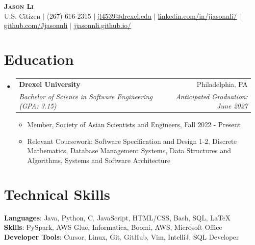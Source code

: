 \documentclass[letterpaper,11pt]{article}
\makeatletter
\newcommand{\resumeItem}[1]{
  \item\small{
    {#1 \vspace{-2pt}}
  }
}
\newcommand{\resumeSubheading}[4]{
  \vspace{-2pt}\item
    \begin{tabular*}{0.97\textwidth}[t]{l@{\extracolsep{\fill}}r}
      \textbf{#1} & #2 \\
      \textit{\small#3} & \textit{\small #4} \\
    \end{tabular*}\vspace{-7pt}
}
\newcommand{\resumeSubHeadingListStart}{\begin{itemize}[leftmargin=0.15in, label={}]}
\newcommand{\resumeSubHeadingListEnd}{\end{itemize}}
\newcommand{\resumeItemListStart}{\begin{itemize}}
\newcommand{\resumeItemListEnd}{\end{itemize}\vspace{-5pt}}
\makeatother
\begin{document}
\begin{center}
    \textbf{\Huge \scshape Jason Li} \\ \vspace{1pt}
    \small U.S. Citizen $|$ (267) 616-2315 $|$ 
    \href{mailto:jl4539@drexel.edu}{\underline{jl4539@drexel.edu}} $|$ 
    \href{https://linkedin.com/in/jjasonnli/}{\underline{linkedin.com/in/jjasonnli/}} $|$ 
    \href{https://github.com/Jjasonnli}{\underline{github.com/Jjasonnli}} $|$ 
    \href{https://jjasonnli.github.io/}{\underline{jjasonnli.github.io/}}
\end{center}

\section{Education}
  \resumeSubHeadingListStart
    \resumeSubheading
      {Drexel University}{Philadelphia, PA}
      {Bachelor of Science in Software Engineering (GPA: 3.15)}{Anticipated Graduation: June 2027}
      \resumeItemListStart
        \resumeItem{Member, Society of Asian Scientists and Engineers, Fall 2022 - Present}
        \resumeItem{Relevant Coursework: Software Specification and Design 1-2, Discrete Mathematics, Database Management Systems, Data Structures and Algorithms, Systems and Software Architecture}
      \resumeItemListEnd
    \resumeSubHeadingListEnd
\section{Technical Skills}
\begin{itemize}[leftmargin=0.15in, label={}]
  \small{\item{
    \textbf{Languages}{: Java, Python, C, JavaScript, HTML/CSS, Bash, SQL, LaTeX} \\
    \textbf{Skills}{: PySpark, AWS Glue, Informatica, Boomi, AWS, Microsoft Office} \\
    \textbf{Developer Tools}{: Cursor, Linux, Git, GitHub, Vim, IntelliJ, SQL Developer}
  }}
\end{itemize}

\end{document}
